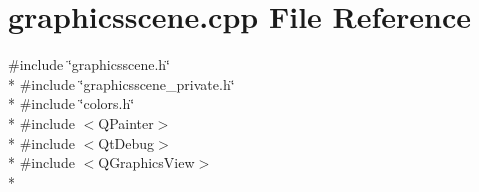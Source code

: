 \section{graphicsscene.\+cpp File Reference}
\label{bk3_2graphicsscene_8cpp}
{\ttfamily \#include \char`\"{}graphicsscene.\+h\char`\"{}}\\*
{\ttfamily \#include \char`\"{}graphicsscene\+\_\+private.\+h\char`\"{}}\\*
{\ttfamily \#include \char`\"{}colors.\+h\char`\"{}}\\*
{\ttfamily \#include $<$Q\+Painter$>$}\\*
{\ttfamily \#include $<$Qt\+Debug$>$}\\*
{\ttfamily \#include $<$Q\+Graphics\+View$>$}\\*
